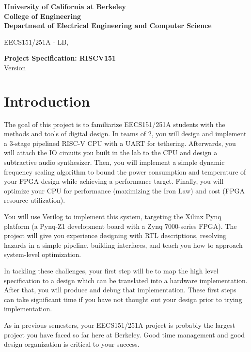 \documentclass[11pt]{article}
\begin{document}
\begin{center}
{\bf
University of California at Berkeley \\
College of Engineering \\
Department of Electrical Engineering and Computer Science \\
}
\end{center}

\begin{center}
EECS151/251A - LB, \currentSemester
\end{center}

\begin{center}
\LARGE
{\bf Project Specification: RISCV151 }  \\
Version \projectSpecVersion
\end{center}

\tableofcontents

\newpage

\section{Introduction}
The goal of this project is to familiarize EECS151/251A students with the methods and tools of digital design.
In teams of 2, you will design and implement a 3-stage pipelined RISC-V CPU with a UART for tethering.
Afterwards, you will attach the IO circuits you built in the lab to the CPU and design a subtractive audio synthesizer.
Then, you will implement a simple dynamic frequency scaling algorithm to bound the power consumption and temperature of your FPGA design while achieving a performance target.
Finally, you will optimize your CPU for performance (maximizing the Iron Law) and cost (FPGA resource utilization).

You will use Verilog to implement this system, targeting the Xilinx Pynq platform (a Pynq-Z1 development board with a Zynq 7000-series FPGA).
The project will give you experience designing with RTL descriptions, resolving hazards in a simple pipeline, building interfaces, and teach you how to approach system-level optimization.

In tackling these challenges, your first step will be to map the high level specification to a design which can be translated into a hardware implementation.
After that, you will produce and debug that implementation.
These first steps can take significant time if you have not thought out your design prior to trying implementation.

As in previous semesters, your EECS151/251A project is probably the largest project you have faced so far here at Berkeley.
Good time management and good design organization is critical to your success.
\end{document}
